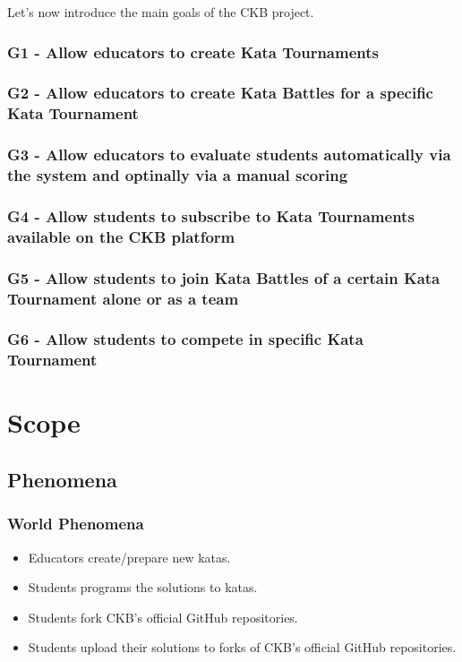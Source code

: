 \documentclass[11pt]{report}
\begin{document}
    Let's now introduce the main goals of the CKB project.
    \subsubsection{G1 - Allow educators to create Kata Tournaments}
    \subsubsection{G2 - Allow educators to create Kata Battles for a specific Kata Tournament} 
    \subsubsection{G3 - Allow educators to evaluate students automatically via the system and optinally via a manual scoring}
    \subsubsection{G4 - Allow students to subscribe to Kata Tournaments available on the CKB platform}
    \subsubsection{G5 - Allow students to join Kata Battles of a certain Kata Tournament alone or as a team}
    \subsubsection{G6 - Allow students to compete in specific Kata Tournament}

    \section{Scope}
        \subsection{Phenomena}
            \subsubsection{World Phenomena}
                \begin{itemize}
                    \item [$W01$] Educators create/prepare new katas.
                    \item [$W02$] Students programs the solutions to katas.
                    \item [$W03$] Students fork CKB's official GitHub repositories.
                    \item [$W04$] Students upload their solutions to forks of CKB's official GitHub repositories.
                \end{itemize}
\end{document}
